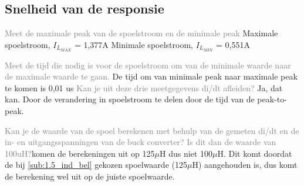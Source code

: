 \subsection{Snelheid van de responsie}

\textcolor{gray}{Meet de maximale peak van de spoelstroom en de minimale peak} \newline
Maximale spoelstroom, \(I_{L_{MAX}}\) = 1,377A \newline
Minimale spoelstroom, \(I_{L_{MIN}}\) = 0,551A\newline

\textcolor{gray}{Meet de tijd die nodig is voor de spoelstroom om van de minimale waarde naar de maximale
waarde te gaan.} \newline
De tijd om van minimale peak naar maximale peak te komen is 0,01 us \newline
\newline
\textcolor{gray}{Kan je uit deze drie meetgegevens di/dt afleiden?} \newline
Ja, dat kan. Door de verandering in spoelstroom te delen door de tijd van de peak-to-peak. \newline

\textcolor{gray}{Kan je de waarde van de spoel berekenen met behulp van de gemeten di/dt en de in- en
uitgangsspanningen van de buck converter? Is dit dan de waarde van 100uH?}komen de berekeningen uit op 125\(\mu\)H dus niet 100\(\mu\)H. Dit komt doordat de bij \autoref{sub:1.5_ind_bel} gekozen spoelwaarde (125\(\mu\)H) aangehouden is, dus komt de berekening wel uit op de juiste spoelwaarde. 
